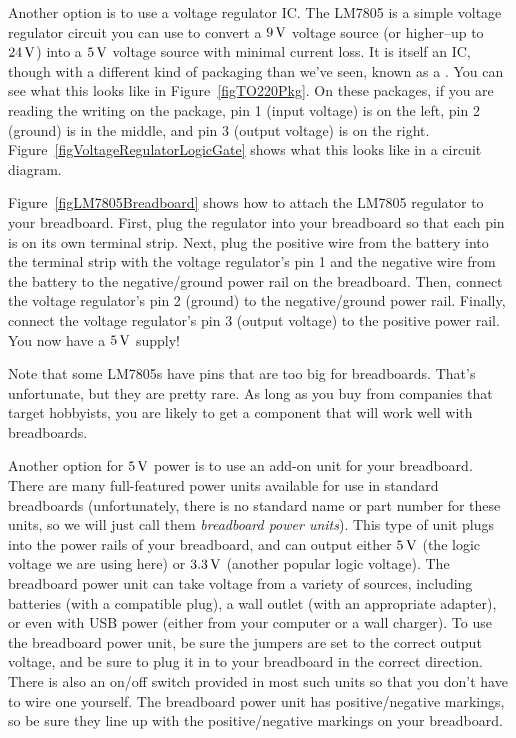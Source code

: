 Another option is to use a voltage regulator IC.
The LM7805 is a simple voltage regulator circuit you can use to convert a $9\,\si{\volt}$ voltage source (or higher--up to $24\,\si{\volt}$) into a $5\,\si{\volt}$ voltage source with minimal current loss.
It is itself an IC, though with a different kind of packaging than we've seen, known as a .
You can see what this looks like in Figure~\ref{figTO220Pkg}.
On these packages, if you are reading the writing on the package, pin 1 (input voltage) is on the left, pin 2 (ground) is in the middle, and pin 3 (output voltage) is on the right.
Figure~\ref{figVoltageRegulatorLogicGate} shows what this looks like in a circuit diagram.



Figure~\ref{figLM7805Breadboard} shows how to attach the LM7805 regulator to your breadboard.
First, plug the regulator into your breadboard so that each pin is on its own terminal strip.
Next, plug the positive wire from the battery into the terminal strip with the voltage regulator's pin 1 and the negative wire from the battery to the negative/ground power rail on the breadboard.
Then, connect the voltage regulator's pin 2 (ground) to the negative/ground power rail. 
Finally, connect the voltage regulator's pin 3 (output voltage) to the positive power rail.
You now have a $5\,\si{\volt}$ supply!

Note that some LM7805s have pins that are too big for breadboards.
That's unfortunate, but they are pretty rare.  
As long as you buy from companies that target hobbyists, you are likely to get a component that will work well with breadboards.

Another option for $5\,\si{\volt}$ power is to use an add-on unit for your breadboard.
There are many full-featured power units available for use in standard breadboards (unfortunately, there is no standard name or part number for these units, so we will just call them \emph{breadboard power units}).
This type of unit plugs into the power rails of your breadboard, and can output either $5\,\si{\volt}$ (the logic voltage we are using here) or $3.3\,\si{\volt}$ (another popular logic voltage).
The breadboard power unit can take voltage from a variety of sources, including batteries (with a compatible plug), a wall outlet (with an appropriate adapter), or even with USB power (either from your computer or a wall charger).
To use the breadboard power unit, be sure the jumpers are set to the correct output voltage, and be sure to plug it in to your breadboard in the correct direction.  
There is also an on/off switch provided in most such units so that you don't have to wire one yourself.
The breadboard power unit has positive/negative markings, so be sure they line up with the positive/negative markings on your breadboard.

